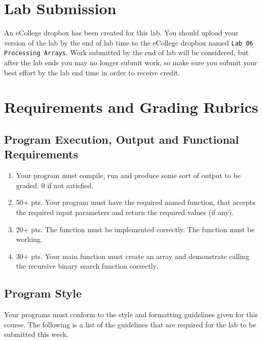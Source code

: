 \documentclass[11pt]{article}
\begin{document}
\section*{Lab Submission}
\label{sec-4}


An eCollege dropbox has been created for this lab.  You should
upload your version of the lab by the end of lab time to the eCollege
dropbox named \verb~Lab 06 Processing Arrays~.  Work submitted by the end
of lab will be considered, but after the lab ends you may no longer
submit work, so make sure you submit your best effort by the lab end
time in order to receive credit.
\section*{Requirements and Grading Rubrics}
\label{sec-5}
\subsection*{Program Execution, Output and Functional Requirements}
\label{sec-5-1}


\begin{enumerate}
\item Your program must compile, run and produce some sort of output to be
  graded. 0 if not satisfied.
\item 50+ pts.  Your program must have the required named function,
   that accepts the required input parameters and return the required
   values (if any).
\item 20+ pts. The function must be implemented correctly.  The function
   must be working.
\item 30+ pts. Your main function must create an array and demonstrate
   calling the recursive binary search function correctly.
\end{enumerate}
\subsection*{Program Style}
\label{sec-5-2}


Your programs must conform to the style and formatting guidelines given for this course.
The following is a list of the guidelines that are required for the lab to be submitted
this week.
\end{document}
